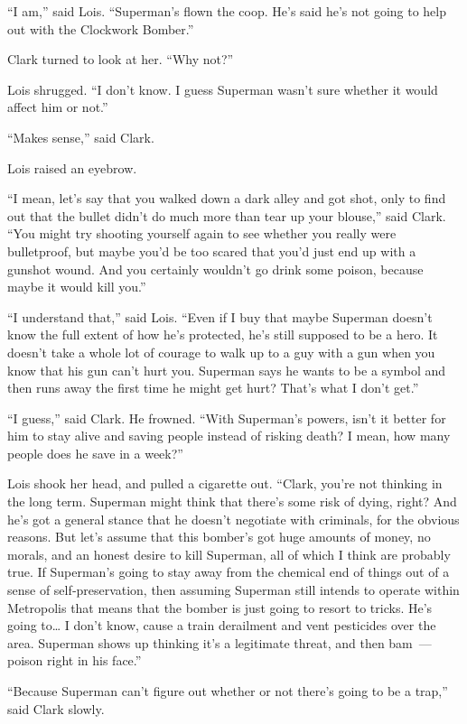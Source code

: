 \documentclass[ebook,12pt]{memoir}
\begin{document}
``I am,'' said Lois. ``Superman's flown the coop. He's said he's not
going to help out with the Clockwork Bomber.''

Clark turned to look at her. ``Why not?''

Lois shrugged. ``I don't know. I guess Superman wasn't sure whether it
would affect him or not.''

``Makes sense,'' said Clark.

Lois raised an eyebrow.

``I mean, let's say that you walked down a dark alley and got shot, only
to find out that the bullet didn't do much more than tear up your
blouse,'' said Clark. ``You might try shooting yourself again to see
whether you really were bulletproof, but maybe you'd be too scared that
you'd just end up with a gunshot wound. And you certainly wouldn't go
drink some poison, because maybe it would kill you.''

``I understand that,'' said Lois. ``Even if I buy that maybe Superman
doesn't know the full extent of how he's protected, he's still supposed
to be a hero. It doesn't take a whole lot of courage to walk up to a guy
with a gun when you know that his gun can't hurt you. Superman says he
wants to be a symbol and then runs away the first time he might get
hurt? That's what I don't get.''

``I guess,'' said Clark. He frowned. ``With Superman's powers, isn't it
better for him to stay alive and saving people instead of risking death?
I mean, how many people does he save in a week?''

Lois shook her head, and pulled a cigarette out. ``Clark, you're not
thinking in the long term. Superman might think that there's some risk
of dying, right? And he's got a general stance that he doesn't negotiate
with criminals, for the obvious reasons. But let's assume that this
bomber's got huge amounts of money, no morals, and an honest desire to
kill Superman, all of which I think are probably true. If Superman's
going to stay away from the chemical end of things out of a sense of
self‐preservation, then assuming Superman still intends to operate
within Metropolis that means that the bomber is just going to resort to
tricks. He's going to\ldots{} I don't know, cause a train derailment and
vent pesticides over the area. Superman shows up thinking it's a
legitimate threat, and then bam~--- poison right in his face.''

``Because Superman can't figure out whether or not there's going to be a
trap,'' said Clark slowly.
\end{document}

